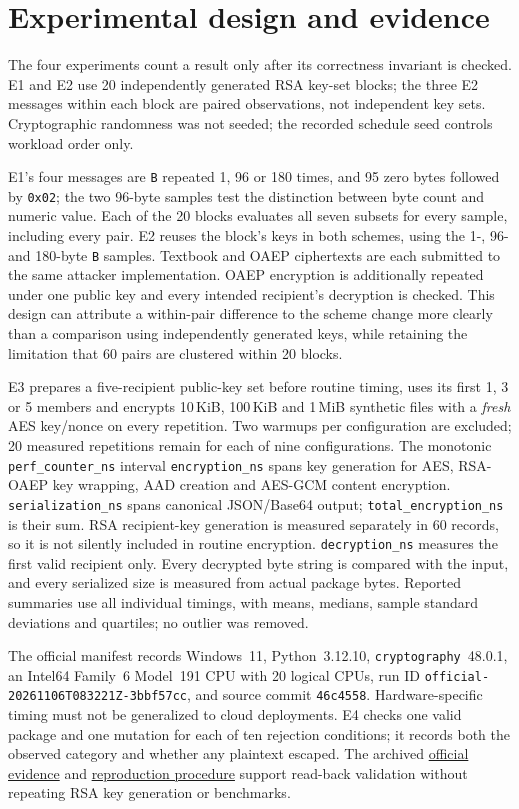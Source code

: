 \section{Experimental design and evidence}
The four experiments count a result only after its correctness invariant is checked. E1 and E2 use 20 independently generated RSA key-set blocks; the three E2 messages within each block are paired observations, not independent key sets. Cryptographic randomness was not seeded; the recorded schedule seed controls workload order only.

E1's four messages are \texttt{B} repeated 1, 96 or 180 times, and 95 zero bytes followed by \texttt{0x02}; the two 96-byte samples test the distinction between byte count and numeric value. Each of the 20 blocks evaluates all seven subsets for every sample, including every pair. E2 reuses the block's keys in both schemes, using the 1-, 96- and 180-byte \texttt{B} samples. Textbook and OAEP ciphertexts are each submitted to the same attacker implementation. OAEP encryption is additionally repeated under one public key and every intended recipient's decryption is checked. This design can attribute a within-pair difference to the scheme change more clearly than a comparison using independently generated keys, while retaining the limitation that 60 pairs are clustered within 20 blocks.

E3 prepares a five-recipient public-key set before routine timing, uses its first 1, 3 or 5 members and encrypts 10\,KiB, 100\,KiB and 1\,MiB synthetic files with a \emph{fresh} AES key/nonce on every repetition. Two warmups per configuration are excluded; 20 measured repetitions remain for each of nine configurations. The monotonic \texttt{perf\_counter\_ns} interval \texttt{encryption\_ns} spans key generation for AES, RSA-OAEP key wrapping, AAD creation and AES-GCM content encryption. \texttt{serialization\_ns} spans canonical JSON/Base64 output; \texttt{total\_encryption\_ns} is their sum. RSA recipient-key generation is measured separately in 60 records, so it is not silently included in routine encryption. \texttt{decryption\_ns} measures the first valid recipient only. Every decrypted byte string is compared with the input, and every serialized size is measured from actual package bytes. Reported summaries use all individual timings, with means, medians, sample standard deviations and quartiles; no outlier was removed.

The official manifest records Windows~11, Python~3.12.10, \texttt{cryptography}~48.0.1, an Intel64 Family~6 Model~191 CPU with 20 logical CPUs, run ID \texttt{official-20261106T083221Z-3bbf57cc}, and source commit \texttt{46c4558}. Hardware-specific timing must not be generalized to cloud deployments. E4 checks one valid package and one mutation for each of ten rejection conditions; it records both the observed category and whether any plaintext escaped. The archived \href{https://github.com/Dung092005/Crypto-project/tree/main/docs/evidence/official-20261106T083221Z-3bbf57cc}{official evidence} and \href{https://github.com/Dung092005/Crypto-project/blob/main/docs/REPRODUCIBILITY.md}{reproduction procedure} support read-back validation without repeating RSA key generation or benchmarks.
\FloatBarrier
